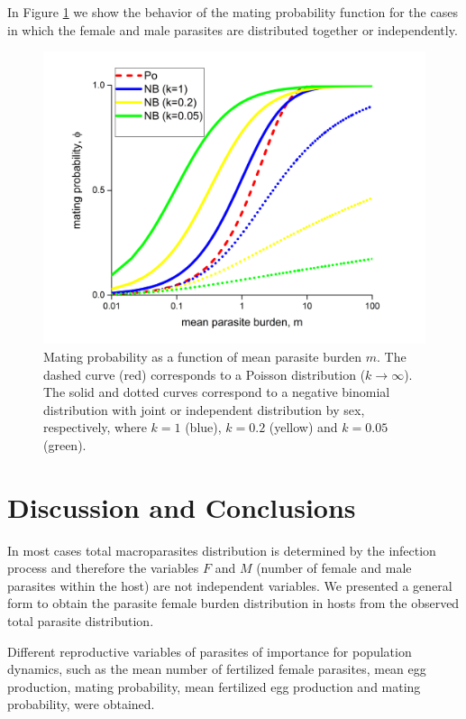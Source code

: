 \documentclass[useAMS,referee,usenatbib]{biom}
\begin{document}
In Figure \ref{fig:funphi} we show the behavior of the mating probability function for the cases in which the female and male parasites are distributed together or independently.
\begin{figure}
		\centering
		\includegraphics[width=0.99\linewidth]{phi-inde}
		\caption{Mating probability as a function of mean parasite burden $m$. The dashed curve (red) corresponds to a Poisson distribution ($k\to \infty$). 
		The solid and dotted curves correspond to a negative binomial distribution with joint or independent distribution by sex, respectively, where $k = 1$ (blue), $k =0.2$ (yellow) and $k =0.05$ (green).
		} 
		\label{fig:funphi}
\end{figure}
\section{Discussion and Conclusions}


In most cases total macroparasites distribution is determined by the infection process and therefore the variables $F$ and $M$ (number of female and male parasites within the host) are not independent variables. We presented a general form to obtain the parasite female burden distribution in hosts from the observed total parasite distribution. 	

Different reproductive variables of parasites of importance for population dynamics, such as the mean number of fertilized female parasites, mean egg production, mating probability, mean fertilized egg production and mating probability, were obtained. 
\end{document}

